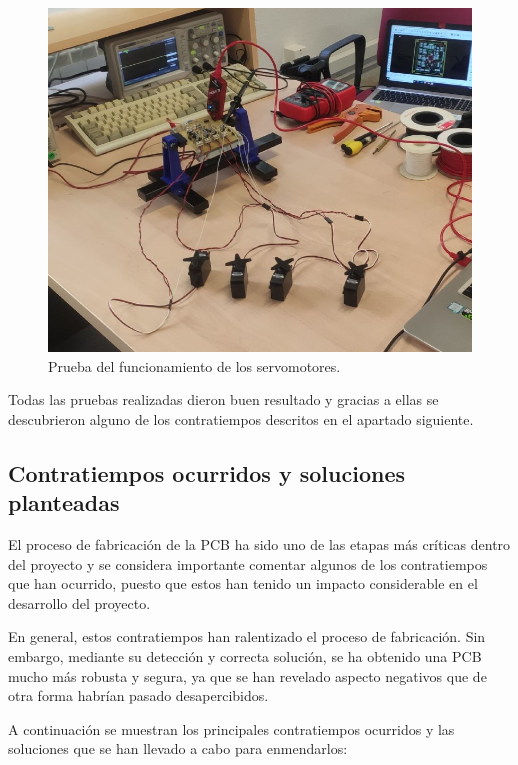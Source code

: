 \begin{itemize}
    \begin{figure}[H]
    \centering 
    \includegraphics[width=0.55\linewidth]{pictures/PruebaServos.jpg}
    \caption{Prueba del funcionamiento de los servomotores.}
    \end{figure}
    
\end{itemize}

Todas las pruebas realizadas dieron buen resultado y gracias a ellas se descubrieron alguno de los contratiempos descritos en el apartado siguiente.

\subsection{Contratiempos ocurridos y soluciones planteadas}

El proceso de fabricación de la \ac{PCB} ha sido uno de las etapas más críticas dentro del proyecto y se considera importante comentar algunos de los contratiempos que han ocurrido, puesto que estos han tenido un impacto considerable en el desarrollo del proyecto.

En general, estos contratiempos han ralentizado el proceso de fabricación. Sin embargo, mediante su detección y correcta solución, se ha obtenido una \ac{PCB} mucho más robusta y segura, ya que se han revelado aspecto negativos que de otra forma habrían pasado desapercibidos.

A continuación se muestran los principales contratiempos ocurridos y las soluciones que se han llevado a cabo para enmendarlos:

